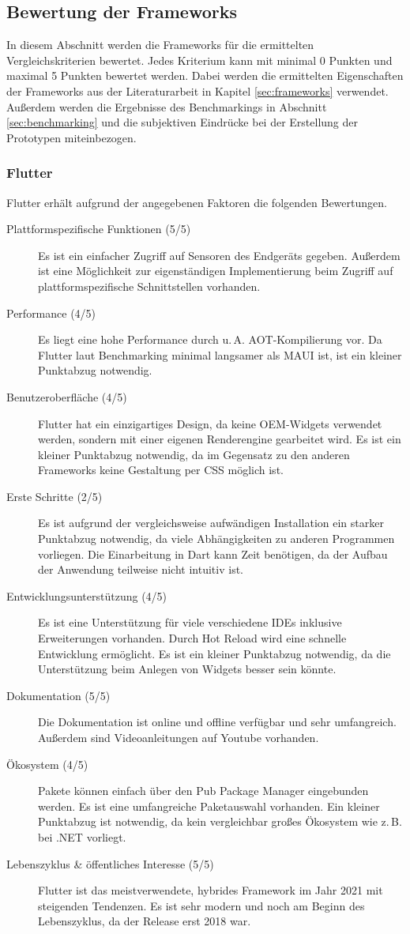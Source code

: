 \documentclass[]{lni}
\begin{document}
\subsection{Bewertung der Frameworks} \label{sec:bewertung}
In diesem Abschnitt werden die Frameworks für die ermittelten Vergleichskriterien bewertet. Jedes Kriterium kann mit minimal 0 Punkten und maximal 5 Punkten bewertet werden. Dabei werden die ermittelten Eigenschaften der Frameworks aus der Literaturarbeit in Kapitel \ref{sec:frameworks} verwendet. Außerdem werden die Ergebnisse des Benchmarkings in Abschnitt \ref{sec:benchmarking} und die subjektiven Eindrücke bei der Erstellung der Prototypen miteinbezogen.

\subsubsection{Flutter}
Flutter erhält aufgrund der angegebenen Faktoren die folgenden Bewertungen.
\begin{description}
	\item[Plattformspezifische Funktionen (5/5)] Es ist ein einfacher Zugriff auf Sensoren des Endgeräts gegeben. Außerdem ist eine Möglichkeit zur eigenständigen Implementierung beim Zugriff auf plattformspezifische Schnittstellen vorhanden.
	\item[Performance (4/5)] Es liegt eine hohe Performance durch u.\,A. AOT-Kompilierung vor. Da Flutter laut Benchmarking minimal langsamer als MAUI ist, ist ein kleiner Punktabzug notwendig.
	\item[Benutzeroberfläche (4/5)] Flutter hat ein einzigartiges Design, da keine OEM-Widgets verwendet werden, sondern mit einer eigenen Renderengine gearbeitet wird. Es ist ein kleiner Punktabzug notwendig, da im Gegensatz zu den anderen Frameworks keine Gestaltung per CSS möglich ist.
	\item[Erste Schritte (2/5)] Es ist aufgrund der vergleichsweise aufwändigen Installation ein starker Punktabzug notwendig, da viele Abhängigkeiten zu anderen Programmen vorliegen. Die Einarbeitung in Dart kann Zeit benötigen, da der Aufbau der Anwendung teilweise nicht intuitiv ist.
	\item[Entwicklungsunterstützung (4/5)] Es ist eine Unterstützung für viele verschiedene IDEs inklusive Erweiterungen vorhanden. Durch Hot Reload wird eine schnelle Entwicklung ermöglicht. Es ist ein kleiner Punktabzug notwendig, da die Unterstützung beim Anlegen von Widgets besser sein könnte.
	\item[Dokumentation (5/5)] Die Dokumentation ist online und offline verfügbar und sehr umfangreich. Außerdem sind Videoanleitungen auf Youtube vorhanden.
	\item[Ökosystem (4/5)] Pakete können einfach über den Pub Package Manager eingebunden werden. Es ist eine umfangreiche Paketauswahl vorhanden. Ein kleiner Punktabzug ist notwendig, da kein vergleichbar großes Ökosystem wie z.\,B. bei .NET vorliegt.
	\item[Lebenszyklus \& öffentliches Interesse (5/5)] Flutter ist das meistverwendete, hybrides Framework im Jahr 2021 mit steigenden Tendenzen. Es ist sehr modern und noch am Beginn des Lebenszyklus, da der Release erst 2018 war.
\end{description}
\end{document}
